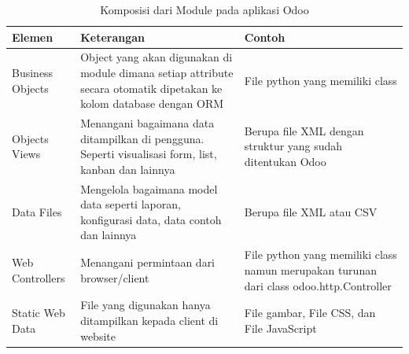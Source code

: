 \begingroup
\setlength{\LTleft}{-20cm plus -1fill}
\setlength{\LTright}{\LTleft}
\begin{small}
	\begin{longtable}{|p{3cm}|p{5cm}|p{5cm}|}
		\caption{Komposisi dari Module pada aplikasi Odoo}\\
		\hline
		\textbf{Elemen} & \textbf{Keterangan} & \textbf{Contoh}\\
		\endfirsthead
		
		\hline
		    Business Objects
		  & Object yang akan digunakan di module dimana setiap attribute secara otomatik dipetakan ke kolom database dengan ORM
		  & File python yang memiliki class\\
		\hline  
		Objects Views
		  & Menangani bagaimana data ditampilkan di pengguna. Seperti visualisasi form, list, kanban dan lainnya
		  & Berupa file XML dengan struktur yang sudah ditentukan Odoo\\
		\hline
		Data Files
		  & Mengelola bagaimana model data seperti laporan, konfigurasi data, data contoh dan lainnya
		  & Berupa file XML atau CSV\\
		\hline
		Web Controllers
		  & Menangani permintaan dari browser/client
		  & File python yang memiliki class namun merupakan turunan dari class odoo.http.Controller\\
		\hline
		  Static Web Data
		  & File yang digunakan hanya ditampilkan kepada client di website
		  & File gambar, File CSS, dan File JavaScript\\
		 \hline  
	\end{longtable}
\end{small}
\endgroup

